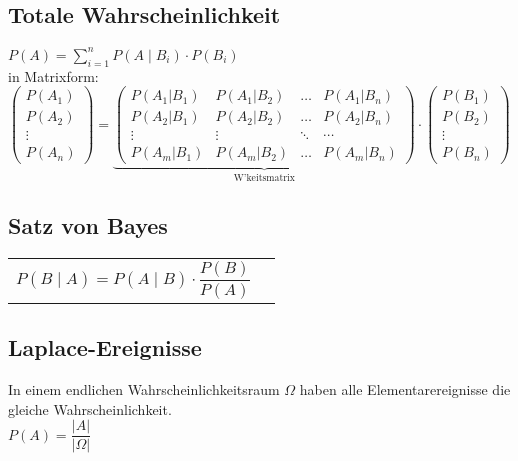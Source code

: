\begin{minipage}[t]{11.5cm}
	\subsection{Totale Wahrscheinlichkeit \skript{\pageref{sk-zerlegung}}}
		$\boxed{P(A)=\sum\limits_{i=1}^n P(A\mid B_i)\cdot P(B_i)}$ \\
	
		in Matrixform: \\
		$\begin{pmatrix}P(A_1)\\P(A_2)\\\vdots\\P(A_n)\end{pmatrix} = 
		\underbrace{\begin{pmatrix}P(A_1|B_1) & P(A_1|B_2) & \ldots & P(A_1|B_n) \\
		P(A_2|B_1) & P(A_2|B_2) & \ldots & P(A_2|B_n) \\
		\vdots & \vdots & \ddots & \cdots \\
		P(A_m|B_1) & P(A_m|B_2) & \ldots & P(A_m|B_n)\end{pmatrix}}_{\text{W'keitsmatrix}}
		\cdot \begin{pmatrix}P(B_1)\\P(B_2)\\\vdots\\P(B_n)\end{pmatrix}$
	\end{minipage}
\begin{minipage}[t]{7cm}
\subsection{Satz von Bayes \skript{\pageref{sk-satz-von-bayes}}}
\begin{tabular}{ll}
  $\boxed{P(B\mid A)=P(A\mid B) \cdot\dfrac{P(B)}{P(A)}}$
  \vspace{1mm}
\end{tabular}
\subsection{Laplace-Ereignisse \skript{\pageref{sk-section-laplace-ereignisse}}}
In einem endlichen Wahrscheinlichkeitsraum $\Omega$ haben alle
Elementarereignisse die gleiche Wahrscheinlichkeit. \\
$\boxed{P(A)=\dfrac{\left| A\right|}{\left|\Omega\right|}}$ \\
\end{minipage}\\ \ \\

